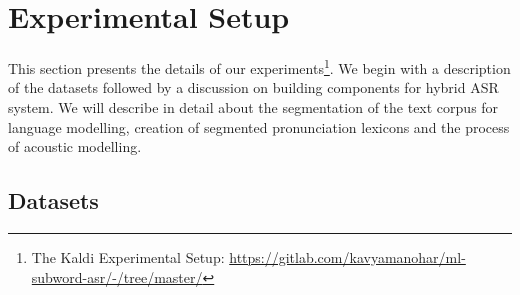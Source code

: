 



\section{Experimental Setup}
\label{expsetup}

This section presents the details of our experiments\footnote{The Kaldi
    Experimental Setup:
    \url{https://gitlab.com/kavyamanohar/ml-subword-asr/-/tree/master/}}. We begin
with a description of the datasets followed by a discussion on building components for hybrid ASR system. We will describe in detail about the segmentation of the text corpus
for language modelling, creation of segmented pronunciation lexicons and the
process of acoustic modelling.

\subsection{Datasets}


